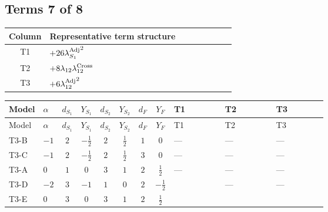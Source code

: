 \documentclass[8pt]{article}
\begin{document}
\begin{landscape}
\subsection*{Terms 7 of 8}
\begin{center}
\begin{tabular}{@{}c >{\raggedright\arraybackslash}p{0.82\linewidth}@{}}
\toprule
Column & Representative term structure \\
\midrule
T1 & \(\displaystyle +26 {\lambda_{S_1}^{\rm Adj}}^2\) \\
\midrule
T2 & \(\displaystyle +8 {\lambda_{12}} {\lambda_{12}^{\rm Cross}}\) \\
\midrule
T3 & \(\displaystyle +6 {\lambda_{12}^{\rm Adj}}^2\) \\
\midrule
\bottomrule
\end{tabular}
\end{center}
\smallskip
\tiny
\begin{longtable}{@{}llcccccc >{\raggedright\arraybackslash}p{0.21\linewidth} >{\raggedright\arraybackslash}p{0.21\linewidth} >{\raggedright\arraybackslash}p{0.21\linewidth}@{}}
\toprule
Model & $\alpha$ & $d_{S_1}$ & $Y_{S_1}$ & $d_{S_2}$ & $Y_{S_2}$ & $d_F$ & $Y_F$ & T1 & T2 & T3 \\
\midrule
\endfirsthead
\toprule
Model & $\alpha$ & $d_{S_1}$ & $Y_{S_1}$ & $d_{S_2}$ & $Y_{S_2}$ & $d_F$ & $Y_F$ & T1 & T2 & T3 \\
\midrule
\endhead
T3-B & $-1$ & $2$ & $-\frac{1}{2}$ & $2$ & $\frac{1}{2}$ & $1$ & $0$ & --- & --- & --- \\
\midrule
T3-C & $-1$ & $2$ & $-\frac{1}{2}$ & $2$ & $\frac{1}{2}$ & $3$ & $0$ & --- & --- & --- \\
\midrule
T3-A & $0$ & $1$ & $0$ & $3$ & $1$ & $2$ & $\frac{1}{2}$ & --- & --- & --- \\
\midrule
T3-D & $-2$ & $3$ & $-1$ & $1$ & $0$ & $2$ & $-\frac{1}{2}$ & \scriptsize\adjustbox{max width=\linewidth}{$\begin{gathered} +26 {\lambda_{S_1}^{\rm Adj}}^2\end{gathered}$} & --- & --- \\
\midrule
T3-E & $0$ & $3$ & $0$ & $3$ & $1$ & $2$ & $\frac{1}{2}$ & \scriptsize\adjustbox{max width=\linewidth}{$\begin{gathered} +26 {\lambda_{S_1}^{\rm Adj}}^2\end{gathered}$} & \scriptsize\adjustbox{max width=\linewidth}{$\begin{gathered} +8 {\lambda_{12}} {\lambda_{12}^{\rm Cross}}\end{gathered}$} & \scriptsize\adjustbox{max width=\linewidth}{$\begin{gathered} +6 {\lambda_{12}^{\rm Adj}}^2\end{gathered}$} \\
\midrule
\bottomrule
\end{longtable}
\clearpage

\end{landscape}
\end{document}

